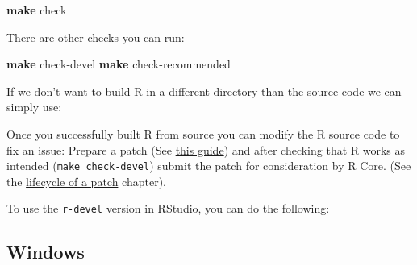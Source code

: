 \documentclass[
]{book}
\newenvironment{Shaded}{\begin{snugshade}}{\end{snugshade}}
\newcommand{\AttributeTok}[1]{\textcolor[rgb]{0.13,0.29,0.53}{#1}}
\newcommand{\BuiltInTok}[1]{#1}
\newcommand{\ExtensionTok}[1]{#1}
\newcommand{\FunctionTok}[1]{\textcolor[rgb]{0.13,0.29,0.53}{\textbf{#1}}}
\newcommand{\NormalTok}[1]{#1}
\newcommand{\OperatorTok}[1]{\textcolor[rgb]{0.81,0.36,0.00}{\textbf{#1}}}
\newcommand{\StringTok}[1]{\textcolor[rgb]{0.31,0.60,0.02}{#1}}
\newcommand{\VariableTok}[1]{\textcolor[rgb]{0.00,0.00,0.00}{#1}}
\begin{document}
\begin{enumerate}
\begin{Shaded}
\begin{Highlighting}[]
\FunctionTok{make}\NormalTok{ check}
\end{Highlighting}
\end{Shaded}

  There are other checks you can run:

\begin{Shaded}
\begin{Highlighting}[]
\FunctionTok{make}\NormalTok{ check{-}devel}
\FunctionTok{make}\NormalTok{ check{-}recommended}
\end{Highlighting}
\end{Shaded}
\end{enumerate}

If we don't want to build R in a different directory than the source code we can simply use:

\begin{Shaded}
\end{Shaded}

Once you successfully built R from source you can modify the R source code to fix an issue: Prepare a patch (See \href{https://www.r-project.org/bugs.html\#how-to-submit-patches}{this guide}) and after checking that R works as intended (\texttt{make\ check-devel}) submit the patch for consideration by R Core.
(See the \hyperref[FixBug]{lifecycle of a patch} chapter).

To use the \texttt{r-devel} version in RStudio, you can do the following:

\begin{Shaded}
\end{Shaded}

\subsection{Windows}\label{windows}
\end{document}
